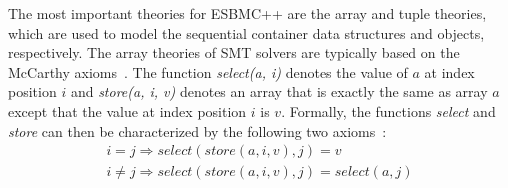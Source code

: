 \documentclass[a4paper]{llncs}
\begin{document}

\smallskip{}
%
The most important theories for ESBMC++ are the array and tuple theories,
which are used to model the sequential container data structures
and objects, respectively.
The array theories of SMT solvers are typically based on the
McCarthy axioms~\cite{McCarthy62}. The function \emph{select(a, i)}
denotes the value of $a$ at index position $i$ and \emph{store(a, i, v)}
denotes an array that is exactly the same as array $a$ except that the
value at index position $i$ is $v$. %
Formally, the functions \emph{select} and \emph{store} can then be characterized
by the following two axioms~\cite{CVC07,Boolector09,Z08}:
%
\[
\begin{array}{l}
  i=j      \Rightarrow select\left(store\left(a,i,v\right),j\right)=v \\
  i \neq j \Rightarrow select\left(store\left(a,i,v\right),j\right)=select\left(a,j\right)
\end{array}
\]
\end{document}
